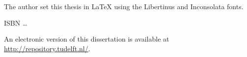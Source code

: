 \begin{titlepage}
\medskip
\medskip
\noindent The author set this thesis in \LaTeX\xspace using the Libertinus and Inconsolata fonts.

\vspace{\bigskipamount}



\noindent ISBN \ldots

\medskip
\noindent An electronic version of this dissertation is available at \\
\url{http://repository.tudelft.nl/}.

\end{titlepage}

